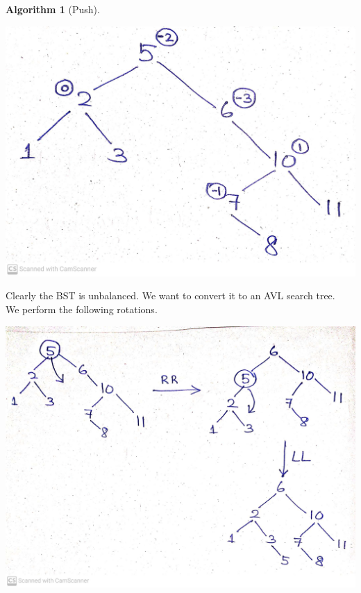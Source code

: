 \documentclass[10pt, a4paper]{extarticle}
\theoremstyle{definition}
\newtheorem{alg}{Algorithm}
\begin{document}
\begin{alg}[Push]
		\begin{center}
			\includegraphics[scale=0.1]{balance1.jpg}\\
		\end{center}
		Clearly the BST is unbalanced. We want to convert it to an AVL search tree.\\
		We perform the following rotations.
		\begin{center}
			\includegraphics[scale=0.14]{balance2.jpg}\\
		\end{center}


\end{alg}
\end{document}
